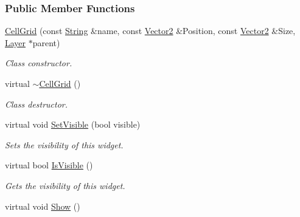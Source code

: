 \subsubsection*{Public Member Functions}
\begin{DoxyCompactItemize}
\item 
\hyperlink{classphys_1_1UI_1_1CellGrid_ace71a7178cd85b2c322403d59aec8e4f}{CellGrid} (const \hyperlink{namespacephys_aa03900411993de7fbfec4789bc1d392e}{String} \&name, const \hyperlink{classphys_1_1Vector2}{Vector2} \&Position, const \hyperlink{classphys_1_1Vector2}{Vector2} \&Size, \hyperlink{classphys_1_1UI_1_1Layer}{Layer} $\ast$parent)
\begin{DoxyCompactList}\small\item\em Class constructor. \item\end{DoxyCompactList}\item 
\hypertarget{classphys_1_1UI_1_1CellGrid_ac1abc38620bbb790afb01443cb2d6853}{
virtual \hyperlink{classphys_1_1UI_1_1CellGrid_ac1abc38620bbb790afb01443cb2d6853}{$\sim$CellGrid} ()}
\label{classphys_1_1UI_1_1CellGrid_ac1abc38620bbb790afb01443cb2d6853}

\begin{DoxyCompactList}\small\item\em Class destructor. \item\end{DoxyCompactList}\item 
virtual void \hyperlink{classphys_1_1UI_1_1CellGrid_abd1b3b422680a8b549c1c897b300da5d}{SetVisible} (bool visible)
\begin{DoxyCompactList}\small\item\em Sets the visibility of this widget. \item\end{DoxyCompactList}\item 
virtual bool \hyperlink{classphys_1_1UI_1_1CellGrid_af53601ab18e77237550c3eb97043e68c}{IsVisible} ()
\begin{DoxyCompactList}\small\item\em Gets the visibility of this widget. \item\end{DoxyCompactList}\item 
\hypertarget{classphys_1_1UI_1_1CellGrid_a772ea260724d009cfe6241e8dac5585b}{
virtual void \hyperlink{classphys_1_1UI_1_1CellGrid_a772ea260724d009cfe6241e8dac5585b}{Show} ()}
\label{classphys_1_1UI_1_1CellGrid_a772ea260724d009cfe6241e8dac5585b}


\end{DoxyCompactItemize}
